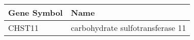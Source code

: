 \begin{tabular}{ll}
\toprule
Gene Symbol &                             Name \\
\midrule
     CHST11 & carbohydrate sulfotransferase 11 \\
\bottomrule
\end{tabular}
